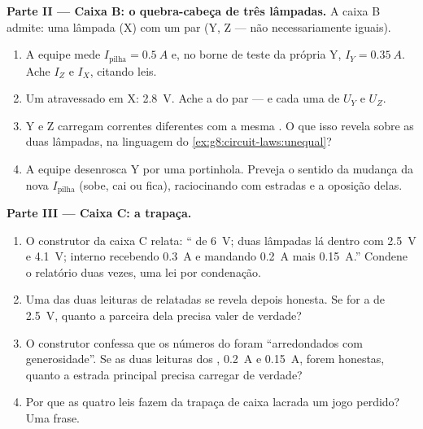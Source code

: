 \begin{problem}
\medskip\noindent\textbf{Parte II --- Caixa B: o quebra-cabeça de
três lâmpadas.}
A caixa B admite: uma lâmpada (X)  com um par  (Y,
Z --- não necessariamente iguais).
\begin{enumerate}[resume]
  \item A equipe mede $I_{\text{pilha}} = \qty{0.5}{A}$ e, no borne
        de teste da própria Y, $I_Y = \qty{0.35}{A}$. Ache $I_Z$ e
        $I_X$, citando leis.
  \item Um  atravessado em X: \qty{2.8}{V}. Ache a 
        do par  --- e cada uma de $U_Y$ e $U_Z$.
  \item Y e Z carregam correntes diferentes com a mesma . O que
        isso revela sobre as duas lâmpadas, na linguagem do
        \cref{ex:g8:circuit-laws:unequal}?
  \item A equipe desenrosca Y por uma portinhola. Preveja o sentido
        da mudança da nova $I_{\text{pilha}}$ (sobe, cai ou fica),
        raciocinando com estradas e a oposição delas.
\end{enumerate}

\medskip\noindent\textbf{Parte III --- Caixa C: a trapaça.}
\begin{enumerate}[resume]
  \item O construtor da caixa C relata: `` de \qty{6}{V}; duas
        lâmpadas  lá dentro com \qty{2.5}{V} e \qty{4.1}{V};
         interno recebendo \qty{0.3}{A} e mandando \qty{0.2}{A}
        mais \qty{0.15}{A}.'' Condene o relatório duas vezes, uma lei
        por condenação.
  \item Uma das duas leituras de  relatadas se revela depois
        honesta. Se for a de \qty{2.5}{V}, quanto a parceira dela
        precisa valer de verdade?
  \item O construtor confessa que os números do  foram
        ``arredondados com generosidade''. Se as duas leituras dos
        , \qty{0.2}{A} e \qty{0.15}{A}, forem honestas, quanto a
        estrada principal precisa carregar de verdade?
  \item Por que as quatro leis fazem da trapaça de caixa lacrada um
        jogo perdido? Uma frase.
\end{enumerate}


\end{problem}
